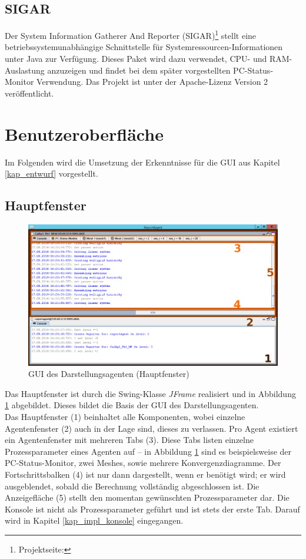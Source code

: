 \documentclass[a4paper,12pt,oneside,openright,onecolumn,final,titlepage,fleqn,ngerman]{scrreprt}
\newcommand{\parag}{\\[2ex]}
\newcommand{\repag}{Darstellungsagent}
\begin{document}
	\subsection{SIGAR}\label{kap_sigar}
	Der System Information Gatherer And Reporter (SIGAR)\footnote{Projektseite: } stellt eine betriebssystemunabhängige Schnittstelle für Systemressourcen-Informationen unter Java zur Verfügung. Dieses Paket wird dazu verwendet, CPU- und RAM-Auslastung anzuzeigen und findet bei dem später vorgestellten PC-Status-Monitor Verwendung. Das Projekt ist unter der Apache-Lizenz Version 2 veröffentlicht.
	
	\section{Benutzeroberfläche}\label{kap_impl_gui}
	Im Folgenden wird die Umsetzung der Erkenntnisse für die GUI aus Kapitel \ref{kap_entwurf} vorgestellt.
	
	\subsection{Hauptfenster}
	\begin{figure}[ht]
		\includegraphics[keepaspectratio=true,width=\textwidth]{res/MainWin.png}
		\caption{GUI des  \repag{}en (Hauptfenster)}
		\label{repag_mainwin}
	\end{figure}
	Das Hauptfenster ist durch die Swing-Klasse \emph{JFrame} realisiert und in Abbildung \ref{repag_mainwin} abgebildet. Dieses bildet die Basis der GUI des \repag{}en.\parag{}
	Das Hauptfenster (1) beinhaltet alle Komponenten, wobei einzelne Agentenfenster (2) auch in der Lage sind, dieses zu verlassen. Pro Agent existiert ein Agentenfenster mit mehreren Tabs (3). Diese Tabs listen einzelne Prozessparameter eines Agenten auf -- in Abbildung \ref{repag_mainwin} sind es beispielsweise der PC-Status-Monitor, zwei Meshes, sowie mehrere Konvergenzdiagramme. Der Fortschrittsbalken (4) ist nur dann dargestellt, wenn er benötigt wird; er wird ausgeblendet, sobald die Berechnung vollständig abgeschlossen ist. Die Anzeigefläche (5) stellt den momentan gewünschten Prozessparameter dar. Die Konsole ist nicht als Prozessparameter geführt und ist stets der erste Tab. Darauf wird in Kapitel \ref{kap_impl_konsole} eingegangen.
	
\end{document}
